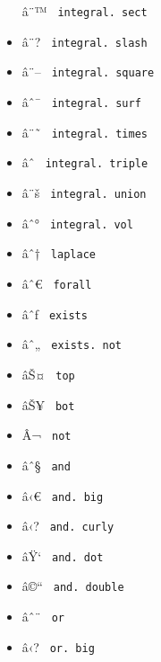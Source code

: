 \begin{itemize}
  \label{symbol-integral.sect}{{ â¨™ }
  \texttt{\ integral.\ sect\ }}
\item
  \label{symbol-integral.slash}{{ â¨? }
  \texttt{\ integral.\ slash\ }}
\item
  \label{symbol-integral.square}{{ â¨-- }
  \texttt{\ integral.\ square\ }}
\item
  \label{symbol-integral.surf}{{ âˆ¯ }
  \texttt{\ integral.\ surf\ }}
\item
  \label{symbol-integral.times}{{ â¨˜ }
  \texttt{\ integral.\ times\ }}
\item
  \label{symbol-integral.triple}{{ âˆ­ }
  \texttt{\ integral.\ triple\ }}
\item
  \label{symbol-integral.union}{{ â¨š }
  \texttt{\ integral.\ union\ }}
\item
  \label{symbol-integral.vol}{{ âˆ° }
  \texttt{\ integral.\ vol\ }}
\item
  \label{symbol-laplace}{{ âˆ† } \texttt{\ laplace\ }}
\item
  \label{symbol-forall}{{ âˆ€ } \texttt{\ forall\ }}
\item
  \label{symbol-exists}{{ âˆƒ } \texttt{\ exists\ }}
\item
  \label{symbol-exists.not}{{ âˆ„ }
  \texttt{\ exists.\ not\ }}
\item
  \label{symbol-top}{{ âŠ¤ } \texttt{\ top\ }}
\item
  \label{symbol-bot}{{ âŠ¥ } \texttt{\ bot\ }}
\item
  \label{symbol-not}{{ Â¬ } \texttt{\ not\ }}
\item
  \label{symbol-and}{{ âˆ§ } \texttt{\ and\ }}
\item
  \label{symbol-and.big}{{ â‹€ } \texttt{\ and.\ big\ }}
\item
  \label{symbol-and.curly}{{ â‹? }
  \texttt{\ and.\ curly\ }}
\item
  \label{symbol-and.dot}{{ âŸ` } \texttt{\ and.\ dot\ }}
\item
  \label{symbol-and.double}{{ â©`` }
  \texttt{\ and.\ double\ }}
\item
  \label{symbol-or}{{ âˆ¨ } \texttt{\ or\ }}
\item
  \label{symbol-or.big}{{ â‹? } \texttt{\ or.\ big\ }}

\end{itemize}
